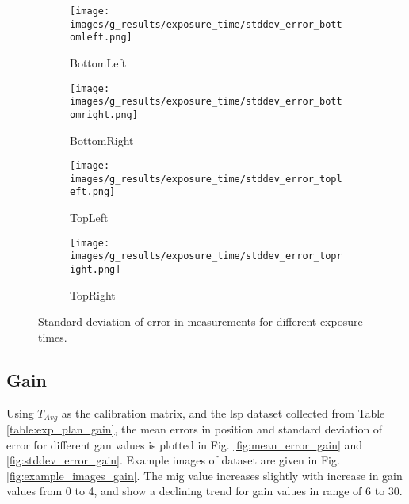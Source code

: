     \begin{figure}[ht]
        \centering
        \begin{subfigure}[b]{0.46\textwidth}
            \centering
            \texttt{[image: images/g\_results/exposure\_time/stddev\_error\_bottomleft.png]}
            \caption{\textsf{BottomLeft}}
        \end{subfigure}
        \hspace{1cm}
        \begin{subfigure}[b]{0.46\textwidth}
            \centering
            \texttt{[image: images/g\_results/exposure\_time/stddev\_error\_bottomright.png]}
            \caption{\textsf{BottomRight}}
        \end{subfigure}

        \vspace{5mm}
        
        \begin{subfigure}[b]{0.46\textwidth}
            \centering
            \texttt{[image: images/g\_results/exposure\_time/stddev\_error\_topleft.png]}
            \caption{\textsf{TopLeft}}
        \end{subfigure}
        \hspace{1cm}
        \begin{subfigure}[b]{0.46\textwidth}
            \centering
            \texttt{[image: images/g\_results/exposure\_time/stddev\_error\_topright.png]}
            \caption{\textsf{TopRight}}
        \end{subfigure}

        \caption{Standard deviation of error in measurements for different exposure times.}
        \label{fig:stddev_error_exposure_time}
    \end{figure}

\clearpage

\subsection*{Gain}
    Using $T_{Avg}$ as the calibration matrix, and the \gls{lsp} dataset collected from Table \ref{table:exp_plan_gain}, the mean errors in position and standard deviation of error for different gan values is plotted in Fig. \ref{fig:mean_error_gain} and \ref{fig:stddev_error_gain}. Example images of dataset are given in Fig. \ref{fig:example_images_gain}. The \gls{mig} value increases slightly with increase in gain values from 0 to 4, and show a declining trend for gain values in range of 6 to 30.  

